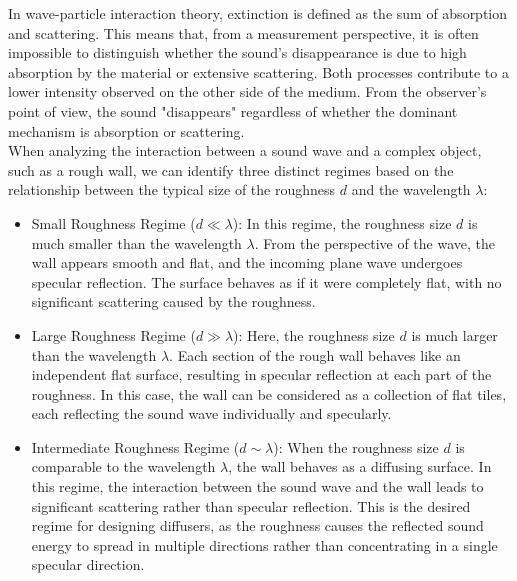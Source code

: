 \documentclass[a4paper]{article}
\begin{document}
In wave-particle interaction theory, extinction is defined as the sum of absorption and scattering. This means that, from a measurement perspective, it is often impossible to distinguish whether the sound's disappearance is due to high absorption by the material or extensive scattering. Both processes contribute to a lower intensity observed on the other side of the medium. From the observer's point of view, the sound "disappears" regardless of whether the dominant mechanism is absorption or scattering.\\


When analyzing the interaction between a sound wave and a complex object, such as a rough wall, we can identify three distinct regimes based on the relationship between the typical size of the roughness \( d \) and the wavelength \( \lambda \):

\begin{itemize}
    
\item Small Roughness Regime (\( d \ll \lambda \)):  
   In this regime, the roughness size \( d \) is much smaller than the wavelength \( \lambda \). From the perspective of the wave, the wall appears smooth and flat, and the incoming plane wave undergoes specular reflection. The surface behaves as if it were completely flat, with no significant scattering caused by the roughness.

\item Large Roughness Regime (\( d \gg \lambda \)):
   Here, the roughness size \( d \) is much larger than the wavelength \( \lambda \). Each section of the rough wall behaves like an independent flat surface, resulting in specular reflection at each part of the roughness. In this case, the wall can be considered as a collection of flat tiles, each reflecting the sound wave individually and specularly.
   

\item Intermediate Roughness Regime (\( d \sim \lambda \)): 
   When the roughness size \( d \) is comparable to the wavelength \( \lambda \), the wall behaves as a diffusing surface. In this regime, the interaction between the sound wave and the wall leads to significant scattering rather than specular reflection. This is the desired regime for designing diffusers, as the roughness causes the reflected sound energy to spread in multiple directions rather than concentrating in a single specular direction.
   
\end{itemize}
\end{document}
